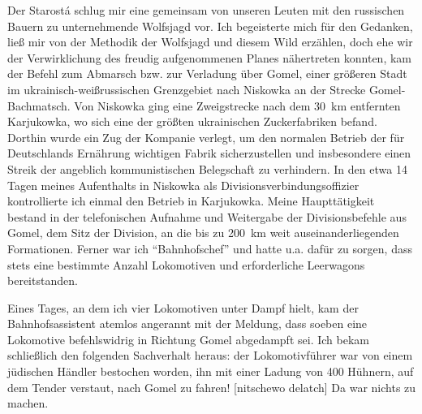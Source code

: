 Der Starostá schlug mir eine gemeinsam von unseren Leuten mit den russischen Bauern zu unternehmende Wolfsjagd vor. Ich begeisterte mich für den Gedanken, ließ mir von der Methodik der Wolfsjagd und diesem Wild erzählen, doch ehe wir der Verwirklichung des freudig aufgenommenen Planes nähertreten konnten, kam der Befehl zum Abmarsch bzw. zur Verladung über Gomel, einer größeren Stadt im ukrainisch-weißrussischen Grenzgebiet nach Niskowka an der Strecke Gomel-Bachmatsch.  Von Niskowka ging eine Zweigstrecke nach dem 30~km entfernten Karjukowka, wo sich eine der größten ukrainischen Zuckerfabriken befand. Dorthin wurde ein Zug der Kompanie verlegt, um den normalen Betrieb der für Deutschlands Ernährung wichtigen Fabrik sicherzustellen und insbesondere einen Streik der angeblich kommunistischen Belegschaft zu verhindern. In den etwa 14 Tagen meines Aufenthalts in Niskowka als Divisionsverbindungsoffizier kontrollierte ich einmal den Betrieb in Karjukowka. Meine Haupttätigkeit bestand in der telefonischen Aufnahme und Weitergabe der Divisionsbefehle aus Gomel, dem Sitz der Division, an die bis zu 200~km weit auseinanderliegenden Formationen. Ferner war ich \enquote{Bahnhofschef} und hatte u.a. dafür zu sorgen, dass stets eine bestimmte Anzahl Lokomotiven und erforderliche Leerwagons bereitstanden.

Eines Tages, an dem ich vier Lokomotiven unter Dampf hielt, kam der Bahnhofsassistent atemlos angerannt mit der Meldung, dass soeben eine Lokomotive befehlswidrig in Richtung Gomel abgedampft sei. Ich bekam schließlich den folgenden Sachverhalt heraus: der Lokomotivführer war von einem jüdischen Händler bestochen worden, ihn mit einer Ladung von 400 Hühnern, auf dem Tender verstaut, nach Gomel zu fahren!  [nitschewo delatch] Da war nichts zu machen.

